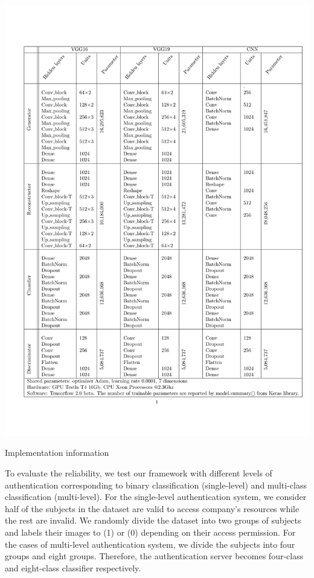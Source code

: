\setcounter{table}{0}
\begin{table}[H]
	\centering
	\includegraphics[width=0.7\linewidth, trim=1cm 2.5cm 0.1cm 2.5cm, clip=true]{tables/implement_table}
	\caption{Implementation information}
	\label{table:implementation}
\end{table}

To evaluate the reliability, we test our framework with different levels of authentication corresponding to binary classification (single-level) and multi-class classification (multi-level). For the single-level authentication system, we consider half of the subjects in the dataset are valid to access company's resources while the rest are invalid. We randomly divide the dataset into two groups of subjects and labels their images to (1) or (0) depending on their access permission. For the cases of multi-level authentication system, we divide the subjects into four groups and eight groups. Therefore, the authentication server becomes four-class and eight-class classifier respectively. 
